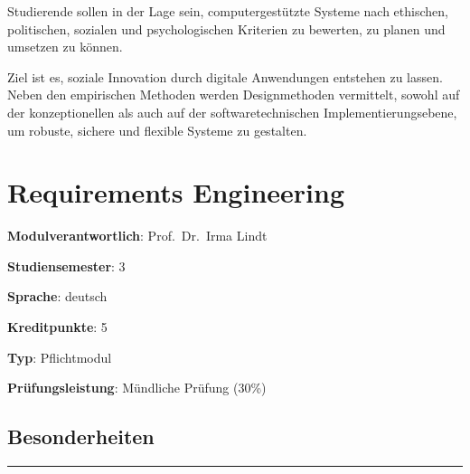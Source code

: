 Studierende sollen in der Lage sein, computergestützte Systeme nach
ethischen, politischen, sozialen und psychologischen Kriterien zu
bewerten, zu planen und umsetzen zu können.

Ziel ist es, soziale Innovation durch digitale Anwendungen entstehen zu
lassen. Neben den empirischen Methoden werden Designmethoden vermittelt,
sowohl auf der konzeptionellen als auch auf der softwaretechnischen
Implementierungsebene, um robuste, sichere und flexible Systeme zu
gestalten.

\hypertarget{requirements-engineeringpathlabel....srcmodulbeschreibungen-bachelor-bpo5ba_requirements-engineering}{%
\chapter{Requirements
Engineering\label{../../src/modulbeschreibungen-bachelor-bpo5/BA_Requirements-Engineering}}\label{requirements-engineeringpathlabel....srcmodulbeschreibungen-bachelor-bpo5ba_requirements-engineering}}

\begin{modulHead}
\textbf{Modulverantwortlich}: Prof.~Dr.~Irma
Lindt
\end{modulHead}
\begin{modulHead}
\textbf{Studiensemester}:
3
\end{modulHead}
\begin{modulHead}
\textbf{Sprache}:
deutsch
\end{modulHead}
\begin{modulHead}
\textbf{Kreditpunkte}:
5
\end{modulHead}
\begin{modulHead}
\textbf{Typ}:
Pflichtmodul
\end{modulHead}
\begin{modulHead}
\textbf{Prüfungsleistung}:
Mündliche Prüfung (30\%)
\end{modulHead}


\hypertarget{besonderheitenpathlabel....srcmodulbeschreibungen-bachelor-bpo5ba_requirements-engineering}{%
\section*{Besonderheiten\label{../../src/modulbeschreibungen-bachelor-bpo5/BA_Requirements-Engineering}}\label{besonderheitenpathlabel....srcmodulbeschreibungen-bachelor-bpo5ba_requirements-engineering}}

\begin{center}\rule{0.5\linewidth}{0.5pt}\end{center}

